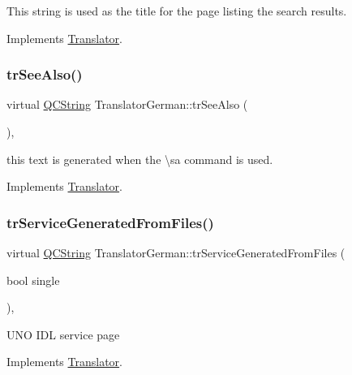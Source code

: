 This string is used as the title for the page listing the search results. 

Implements \mbox{\hyperlink{class_translator}{Translator}}.

\mbox{\label{class_translator_german_a1096daf007f6e91ba1949a0cce92f0e8}} 
\subsubsection{\texorpdfstring{trSeeAlso()}{trSeeAlso()}}
{\footnotesize\ttfamily virtual \mbox{\hyperlink{class_q_c_string}{Q\+C\+String}} Translator\+German\+::tr\+See\+Also (\begin{DoxyParamCaption}{ }\end{DoxyParamCaption})\hspace{0.3cm}{\ttfamily [inline]}, {\ttfamily [virtual]}}

this text is generated when the \textbackslash{}sa command is used. 

Implements \mbox{\hyperlink{class_translator}{Translator}}.

\mbox{\label{class_translator_german_a4c5a99781404c1486ef1d9648cc441b3}} 
\subsubsection{\texorpdfstring{trServiceGeneratedFromFiles()}{trServiceGeneratedFromFiles()}}
{\footnotesize\ttfamily virtual \mbox{\hyperlink{class_q_c_string}{Q\+C\+String}} Translator\+German\+::tr\+Service\+Generated\+From\+Files (\begin{DoxyParamCaption}\item[{bool}]{single }\end{DoxyParamCaption})\hspace{0.3cm}{\ttfamily [inline]}, {\ttfamily [virtual]}}

U\+NO I\+DL service page 

Implements \mbox{\hyperlink{class_translator}{Translator}}.

\mbox{\label{class_translator_german_accb43a522c962ba0e447f69cbd5bdddf}} 

